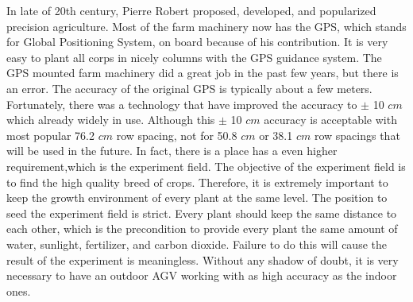 \documentclass[12pt]{article}
\begin{document}
\begin{flushleft}
In late of 20th century, Pierre Robert proposed, developed, and popularized precision agriculture. \cite{mcbratney2005future} Most of the farm machinery now has the GPS, which stands for Global Positioning System, on board because of his contribution. It is very easy to plant all corps in nicely columns with the GPS guidance system. The GPS mounted farm machinery did a great job in the past few years, but there is an error. The accuracy of the original GPS is typically about a few meters. Fortunately, there was a technology that have improved the accuracy to $\pm$ 10 $cm$ which already widely in use. \cite{thuilot2002automatic} Although this $\pm$ 10 $cm$ accuracy is acceptable with most popular 76.2 $cm$ row spacing, not for 50.8 $cm$ or 38.1 $cm$ row spacings that will be used in the future. \cite{fawcett2014farm} In fact, there is a place has a even higher requirement,which is the experiment field. The objective of the experiment field is to find the high quality breed of crops. Therefore, it is extremely important to keep the growth environment of every plant at the same level. The position to seed the experiment field is strict. Every plant should keep the same distance to each other, which is the precondition to provide every plant the same amount of water, sunlight, fertilizer, and carbon dioxide. Failure to do this will cause the result of the experiment is meaningless. Without any shadow of doubt, it is very necessary to have an outdoor AGV working with as high accuracy as the indoor ones.



\end{flushleft}
\end{document}
